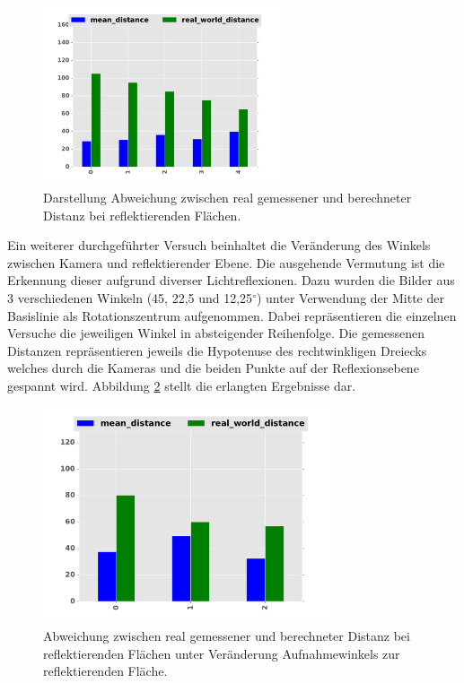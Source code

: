 \begin{figure}[h]
	\centering
	\includegraphics[width=7cm]{img/reflection/reflection_bar}
	\caption{Darstellung Abweichung zwischen real gemessener und berechneter Distanz bei reflektierenden Flächen.}
	\label{fig:reflection_only}	
\end{figure}

\pagebreak
\noindent
Ein weiterer durchgeführter Versuch beinhaltet die Veränderung des Winkels zwischen Kamera und reflektierender Ebene. Die ausgehende Vermutung ist die Erkennung dieser aufgrund diverser Lichtreflexionen. Dazu wurden die Bilder aus 3 verschiedenen Winkeln (45, 22,5 und 12,25$^\circ$) unter Verwendung der Mitte der Basislinie als Rotationszentrum aufgenommen. Dabei repräsentieren die einzelnen Versuche die jeweiligen Winkel in absteigender Reihenfolge. Die gemessenen Distanzen repräsentieren jeweils die Hypotenuse des rechtwinkligen Dreiecks welches durch die Kameras und die beiden Punkte auf der Reflexionsebene gespannt wird. Abbildung \ref{fig:rotation_angle} stellt die erlangten Ergebnisse dar.\\

\begin{figure}[h]
	\centering
	\includegraphics[width=8.5cm]{img/reflection/angle_bar}
	\caption{Abweichung zwischen real gemessener und berechneter Distanz bei reflektierenden Flächen unter Veränderung Aufnahmewinkels zur reflektierenden Fläche.}
	\label{fig:rotation_angle}
\end{figure}

